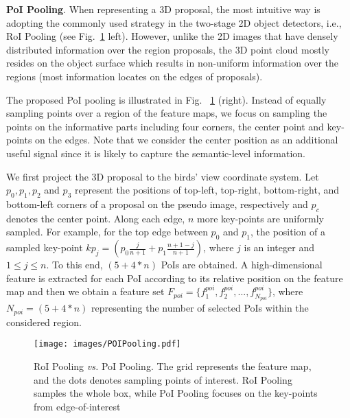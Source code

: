 \documentclass[runningheads]{llncs}
\begin{document}
\noindent\textbf{PoI Pooling}.
When representing a 3D proposal, the most intuitive way is adopting the commonly used strategy in the two-stage 2D object detectors, i.e., RoI Pooling (see Fig.~\ref{fig:POIPooling} left). However, unlike the 2D images that have densely distributed information over the region proposals, the 3D point cloud mostly resides on the object surface which results in non-uniform information over the regions (most information locates on the edges of proposals).

The proposed PoI pooling is illustrated in Fig. ~\ref{fig:POIPooling} (right). Instead of equally sampling points over a region of the feature maps, we focus on sampling the points on the informative parts including four corners, the center point and key-points on the edges. Note that we consider the center position as an additional useful signal since it is likely to capture the semantic-level information. 

We first project the 3D proposal to the birds' view coordinate system. Let $p_{0}, p_1, p_2$ and $p_3$ represent the positions of top-left, top-right, bottom-right, and bottom-left corners of a proposal on the pseudo image, respectively and $p_c$ denotes the center point. Along each edge, $n$ more key-points are uniformly sampled. For example, for the top edge between $p_0$ and $p_1$, the position of a sampled key-point $kp_j= (p_{0}\frac{j}{n+1} + p_{1}\frac{n+1-j}{n+1})$, where $j$ is an integer and $ 1 \leq j \leq n$. 
To this end, $(5 + 4*n)$ PoIs are obtained. A high-dimensional feature is extracted for each PoI according to its relative position on the feature map and then we obtain a feature set $F_{poi}=\{f^{poi}_1, f^{poi}_2,...,f^{poi}_{N_{poi}}\}$, where $N_{poi}=(5 + 4*n)$ representing the number of selected PoIs within the considered region. 

\begin{figure}[t]
\centering
  \texttt{[image: images/POIPooling.pdf]}
\caption{RoI Pooling  \emph{vs.} PoI Pooling. The grid represents the feature map, and the dots denotes sampling points of interest. RoI Pooling samples the whole box, while PoI Pooling focuses on the key-points from edge-of-interest}
\label{fig:POIPooling}
\end{figure}
\end{document}
